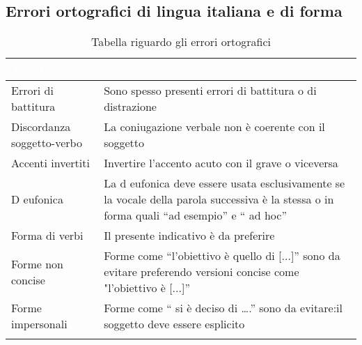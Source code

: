 \subsection{Errori ortografici di lingua italiana e di forma}
{
    \setlength{\freewidth}{\dimexpr\textwidth-10\tabcolsep}
    \renewcommand{\arraystretch}{1.5}
    \centering
    \setlength{\aboverulesep}{0pt}
    \setlength{\belowrulesep}{0pt}
    \begin{longtable}{C{.5\freewidth} C{.5\freewidth}}
       \toprule
    \textcolor{white}{\textbf{Aspetto}}&
    \textcolor{white}{\textbf{Spiegazione}}\\
    \toprule
    \endhead

    Errori di battitura & Sono spesso presenti errori di battitura o di distrazione \\
    Discordanza soggetto-verbo & La coniugazione verbale non è coerente con il soggetto \\
    Accenti invertiti & Invertire l'accento acuto con il grave o viceversa \\
    D eufonica & La d eufonica deve essere usata esclusivamente se la vocale della parola successiva è la stessa o in forma quali “ad esempio” e “ ad hoc” \\
    Forma di verbi & Il presente indicativo è da preferire \\
    Forme non concise & Forme come “l'obiettivo è quello di [...]” sono da evitare preferendo versioni concise come "l'obiettivo è [...]”\\
    Forme impersonali & Forme come “ si è deciso di ….” sono da evitare:il soggetto deve essere esplicito \\  
    
    \bottomrule
    \caption{Tabella riguardo gli errori ortografici}
\end{longtable}
}

\newpage

